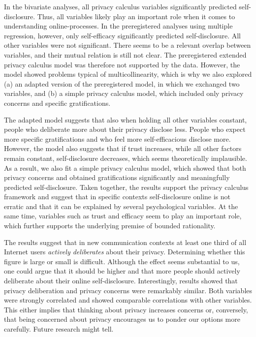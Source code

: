 \documentclass[
  english,
  man,floatsintext]{apa6}
\begin{document}
In the bivariate analyses, all privacy calculus variables significantly predicted self-disclosure.
Thus, all variables likely play an important role when it comes to understanding online-processes.
In the preregistered analyses using multiple regression, however, only self-efficacy significantly predicted self-disclosure.
All other variables were not significant.
There seems to be a relevant overlap between variables, and their mutual relation is still not clear.
The preregistered extended privacy calculus model was therefore not supported by the data.
However, the model showed problems typical of multicollinearity, which is why we also explored (a) an adapted version of the preregistered model, in which we exchanged two variables, and (b) a simple privacy calculus model, which included only privacy concerns and specific gratifications.

The adapted model suggests that also when holding all other variables constant, people who deliberate more about their privacy disclose less.
People who expect more specific gratifications and who feel more self-efficacious disclose more.
However, the model also suggests that if trust increases, while all other factors remain constant, self-disclosure decreases, which seems theoretically implausible.
As a result, we also fit a simple privacy calculus model, which showed that both privacy concerns and obtained gratifications significantly and meaningfully predicted self-disclosure.
Taken together, the results support the privacy calculus framework and suggest that in specific contexts self-disclosure online is not erratic and that it can be explained by several psychological variables.
At the same time, variables such as trust and efficacy seem to play an important role, which further supports the underlying premise of bounded rationality.

The results suggest that in new communication contexts at least one third of all Internet users \emph{actively deliberates} about their privacy.
Determining whether this figure is large or small is difficult.
Although the effect seems substantial to us, one could argue that it should be higher and that more people should actively deliberate about their online self-disclosure.
Interestingly, results showed that privacy deliberation and privacy concerns were remarkably similar.
Both variables were strongly correlated and showed comparable correlations with other variables.
This either implies that thinking about privacy increases concerns or, conversely, that being concerned about privacy encourages us to ponder our options more carefully.
Future research might tell.
\end{document}
